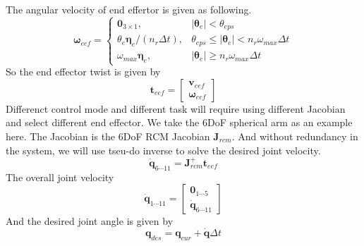 \documentclass{article}
\begin{document}
The angular velocity of end effertor is given as following.
\begin{equation}
\boldsymbol{\omega}_{eef} = \left\{\begin{matrix}
\mathbf{0}_{3\times1}, & |\boldsymbol{\theta}_{e} | < \theta_{eps} \\ 
\theta_e \boldsymbol{\eta}_e / (n_r \Delta t), &  \theta_{eps} \leqslant |\boldsymbol{\theta}_{e}| < n_r \omega_{max} \Delta t\\ 
\omega_{max} \boldsymbol{\eta}_e, & |\boldsymbol{\theta}_{e}| \geqslant n_r \omega_{max} \Delta t
\end{matrix}\right.
\end{equation}
So the end effector twist is given by
\begin{equation}
\mathbf{t}_{eef} = \begin{bmatrix} \mathbf{v}_{eef} \\ \boldsymbol{\omega}_{eef} \end{bmatrix}
\end{equation}
Differenct control mode and different task will require using different Jacobian and select different end effector. We take the 6DoF spherical arm as an example here. The Jacobian is the 6DoF RCM Jacobian $\mathbf{J}_{rcm}$. And without redundancy in the system, we will use tseu-do inverse to solve the desired joint velocity.
\begin{equation}
\dot{\mathbf{q}}_{6\cdots11} = \mathbf{J}_{rcm}^+ \mathbf{t}_{eef}
\end{equation}
The overall joint velocity
\begin{equation}
\dot{\mathbf{q}}_{1\cdots11} = \begin{bmatrix}\mathbf{0}_{1\cdots5} \\ \dot{\mathbf{q}}_{6\cdots11} \end{bmatrix}
\end{equation}
And the desired joint angle is given by
\begin{equation}
\mathbf{q}_{des} = \mathbf{q}_{cur} + \dot{\mathbf{q}} \Delta t
\end{equation}
\end{document}
